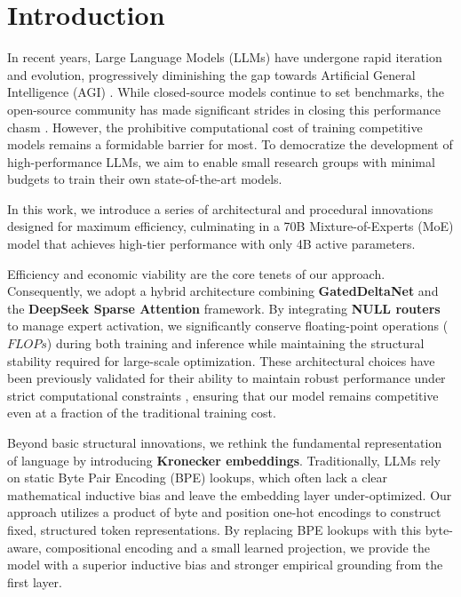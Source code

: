 \section{Introduction}

In recent years, Large Language Models (LLMs) have undergone rapid iteration and evolution, progressively diminishing the gap towards Artificial General Intelligence (AGI) \cite{OpenAI2024, Google2024}. While closed-source models continue to set benchmarks, the open-source community has made significant strides in closing this performance chasm \cite{Meta2024, Jiang2023}. However, the prohibitive computational cost of training competitive models remains a formidable barrier for most. To democratize the development of high-performance LLMs, we aim to enable small research groups with minimal budgets to train their own state-of-the-art models. 

In this work, we introduce a series of architectural and procedural innovations designed for maximum efficiency, culminating in a 70B Mixture-of-Experts (MoE) model that achieves high-tier performance with only 4B active parameters.

Efficiency and economic viability are the core tenets of our approach. Consequently, we adopt a hybrid architecture combining \textbf{GatedDeltaNet} and the \textbf{DeepSeek Sparse Attention} framework. By integrating \textbf{NULL routers} to manage expert activation, we significantly conserve floating-point operations ($FLOPs$) during both training and inference while maintaining the structural stability required for large-scale optimization. These architectural choices have been previously validated for their ability to maintain robust performance under strict computational constraints \cite{RefA2024, RefB2024}, ensuring that our model remains competitive even at a fraction of the traditional training cost.



Beyond basic structural innovations, we rethink the fundamental representation of language by introducing \textbf{Kronecker embeddings}. Traditionally, LLMs rely on static Byte Pair Encoding (BPE) lookups, which often lack a clear mathematical inductive bias and leave the embedding layer under-optimized. Our approach utilizes a product of byte and position one-hot encodings to construct fixed, structured token representations. By replacing BPE lookups with this byte-aware, compositional encoding and a small learned projection, we provide the model with a superior inductive bias and stronger empirical grounding from the first layer.

